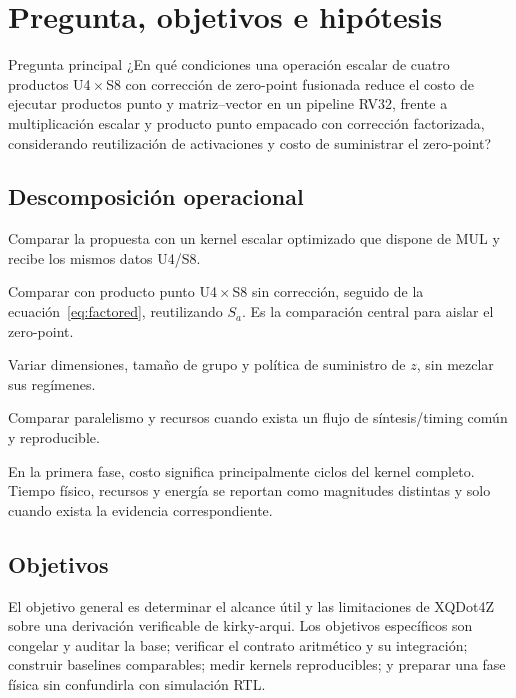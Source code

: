 \section{Pregunta, objetivos e hipótesis}
\begin{questionbox}{Pregunta principal}
¿En qué condiciones una operación escalar de cuatro productos U4\,$\times$\,S8
con corrección de zero-point fusionada reduce el costo de ejecutar productos
punto y matriz--vector en un pipeline RV32, frente a multiplicación escalar
y producto punto empacado con corrección factorizada, considerando reutilización
de activaciones y costo de suministrar el zero-point?
\end{questionbox}

\subsection{Descomposición operacional}
\begin{description}[style=nextline]
\item[RQ1: procesamiento empacado.] Comparar la propuesta con un kernel escalar
optimizado que dispone de MUL y recibe los mismos datos U4/S8.
\item[RQ2: corrección fusionada.] Comparar con producto punto U4\,$\times$\,S8
sin corrección, seguido de la ecuación~\eqref{eq:factored}, reutilizando \(S_a\).
Es la comparación central para aislar el zero-point.
\item[RQ3: condiciones de utilidad.] Variar dimensiones, tamaño de grupo y
política de suministro de \(z\), sin mezclar sus regímenes.
\item[RQ4: compromiso físico posterior.] Comparar paralelismo y recursos cuando
exista un flujo de síntesis/timing común y reproducible.
\end{description}
En la primera fase, costo significa principalmente ciclos del kernel completo.
Tiempo físico, recursos y energía se reportan como magnitudes distintas y
solo cuando exista la evidencia correspondiente.

\subsection{Objetivos}
El objetivo general es determinar el alcance útil y las limitaciones de
XQDot4Z sobre una derivación verificable de kirky-arqui. Los objetivos específicos
son congelar y auditar la base; verificar el contrato aritmético y su integración;
construir baselines comparables; medir kernels reproducibles; y preparar una
fase física sin confundirla con simulación RTL.

